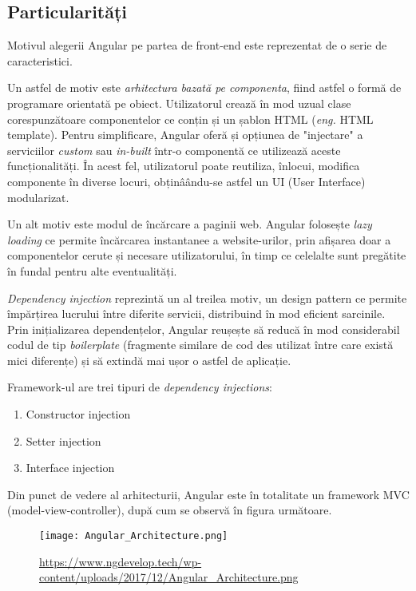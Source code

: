 \subsection{Particularități}
Motivul alegerii Angular pe partea de front-end este reprezentat de o serie de caracteristici.

Un astfel de motiv este \textit{arhitectura bazată pe componenta}, fiind astfel o formă de programare orientată pe obiect. Utilizatorul crează în mod uzual clase corespunzătoare componentelor ce conțin și un șablon HTML (\textit{eng.} HTML template). Pentru simplificare, Angular oferă și opțiunea de "injectare" a serviciilor \textit{custom} sau \textit{in-built} într-o componentă ce utilizează aceste funcționalități. În acest fel, utilizatorul poate reutiliza, înlocui, modifica componente în diverse locuri, obținâându-se astfel un UI (User Interface) modularizat.

Un alt motiv este modul de încărcare a paginii web. Angular folosește \textit{lazy loading} ce permite încărcarea instantanee a website-urilor, prin afișarea doar a componentelor cerute și necesare utilizatorului, în timp ce celelalte sunt pregătite în fundal pentru alte eventualități.

\textit{Dependency injection} reprezintă un al treilea motiv, un design pattern ce permite împărțirea lucrului între diferite servicii, distribuind în mod eficient sarcinile. Prin inițializarea dependențelor, Angular reușește să reducă în mod considerabil codul de tip \textit{boilerplate} (fragmente similare de cod des utilizat între care există mici diferențe) și să extindă mai ușor o astfel de aplicație.

Framework-ul are trei tipuri de \textit{dependency injections}:
\begin{enumerate}
	\item Constructor injection
	\item Setter injection
	\item Interface injection
\end{enumerate}

Din punct de vedere al arhitecturii, Angular este în totalitate un framework MVC (model-view-controller), după cum se observă în figura următoare.

\begin{figure}[H]
	\centering
	\texttt{[image: Angular\_Architecture.png]}
	\caption{\url{https://www.ngdevelop.tech/wp-content/uploads/2017/12/Angular_Architecture.png}}
\end{figure}


